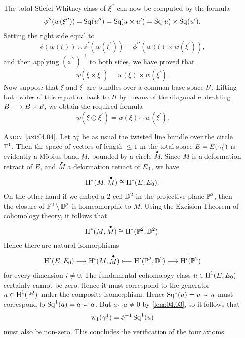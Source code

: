 \documentclass[../main]{subfiles}
\begin{document}
\begin{enumerate}
The total Stiefel-Whitney class of $\xi^{\prime \prime}$ can now be computed by the formula
\[
\phi^{\prime \prime}(w(\xi^{\prime \prime}))=\steenrod(u^{\prime \prime})=\steenrod(u \times u^{\prime})=\steenrod(u) \times \steenrod(u^{\prime}).
\]
Setting the right side equal to
\[
\phi\left(w(\xi)\right) \times \phi^{\prime}\left(w(\xi^{\prime})\right)=\phi^{\prime \prime}\left(w(\xi) \times w(\xi^{\prime})\right),
\]
and then applying $(\phi^{\prime \prime})^{-1}$ to both sides, we have proved that
\[
w(\xi \times \xi^{\prime})=w(\xi) \times w(\xi^{\prime}).
\]
Now suppose that $\xi$ and $\xi^{\prime}$ are bundles over a common base space $\B$. Lifting both sides of this equation back to $\B$ by means of the diagonal embedding $\B  \longrightarrow \B \times \B $, we obtain the required formula
\[
w(\xi \oplus \xi^{\prime})=w(\xi) \smile w(\xi^{\prime}).
\]
\item[\textsc{Axiom} \ref{axi:04.04}.]  Let $\gamma_{1}^{1}$ be as usual the twisted line bundle over the circle $\mathbb{P}^{1}$. Then the space of vectors of length $\leq 1$ in the total space $E=E(\gamma_{1}^{1})$ is evidently a M\"obius band $M$, bounded by a circle $\stackrel{\bullet}{M}$. Since $M$ is a deformation retract of $E$, and $\stackrel{\bullet}{M}$ a deformation retract of $E_{0}$, we have
\[
\operatorname{H}^{*}(M, \stackrel{\bullet}{M}) \cong \operatorname{H}^{*}(E, E_{0}).
\]
On the other hand if we embed a $2$-cell $\mathbb{D}^{2}$ in the projective plane $\mathbb{P}^{2}$, then the closure of $\mathbb{P}^{2}\setminus\mathbb{D}^{2}$ is homeomorphic to $M$. Using the Excision Theorem of cohomology theory, it follows that
\[
\operatorname{H}^{*}(M, \stackrel{\bullet}{M}) \cong \operatorname{H}^{*}(\mathbb{P}^{2}, \mathbb{D}^{2}).
\]
Hence there are natural isomorphisms
\[
\operatorname{H}^{i}(E, E_{0}) \longrightarrow \operatorname{H}^{i}(M, \stackrel{\bullet}{M}) \longleftarrow \operatorname{H}^{i}(\mathbb{P}^{2}, \mathbb{D}^{2}) \longrightarrow \operatorname{H}^{i}(\mathbb{P}^{2})
\]
for every dimension $i \neq 0$. The fundamental cohomology class $u \in \operatorname{H}^{1}(E, E_{0})$ certainly cannot be zero. Hence it must correspond to the generator \newline$a \in \operatorname{H}^{1}(\mathbb{P}^{2})$ under the composite isomorphism. Hence $\operatorname{Sq}^{1}(u)=u \smile u$ must correspond to $\operatorname{Sq}^{1}(a)=a \smile a$. But $a \smile a \neq 0$ by \ref{lem:04.03}, so it follows that
\[
\operatorname{w}_{1}(\gamma_{1}^{1})=\phi^{-1} \operatorname{Sq}^{1}(u)
\]
must also be non-zero. This concludes the verification of the four axioms.
\end{enumerate}
\end{document}
